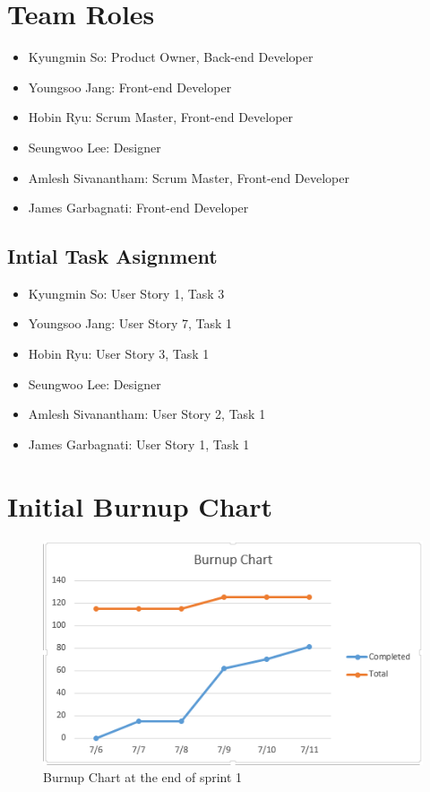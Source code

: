 \documentclass[10pt]{article}
\newcommand{\fancysecX}[2] {{\color{primary}\section*{#1} \label{sec:#2}}}
\newcommand{\fancysubX}[2] {{\color{primary}\subsection*{#1} \label{sec:#2}}}
\begin{document}
\fancysecX{Team Roles}{roles}

    \begin{itemize}
        \item Kyungmin So: Product Owner, Back-end Developer
        \item Youngsoo Jang: Front-end Developer
        \item Hobin Ryu: Scrum Master, Front-end Developer
        \item Seungwoo Lee: Designer
        \item Amlesh Sivanantham: Scrum Master, Front-end Developer
        \item James Garbagnati: Front-end Developer
    \end{itemize}

    \fancysubX{Intial Task Asignment}{intialtask}
        \begin{itemize}
            \item Kyungmin So: User Story 1, Task 3
            \item Youngsoo Jang: User Story 7, Task 1
            \item Hobin Ryu: User Story 3, Task 1
            \item Seungwoo Lee: Designer
            \item Amlesh Sivanantham: User Story 2, Task 1 
            \item James Garbagnati: User Story 1, Task 1
        \end{itemize}

\fancysecX{Initial Burnup Chart}{burnupchart}

    \begin{figure}[!ht]
  	\caption{Burnup Chart at the end of sprint 1}
  	\centering
    		\includegraphics[width=1\textwidth]{Burnupchart1}
    \end{figure}
\end{document}
